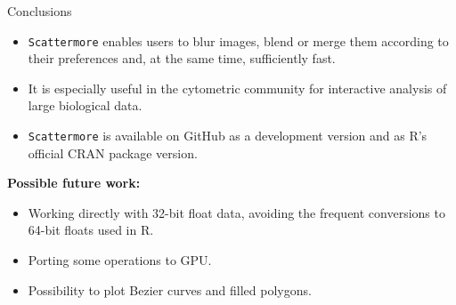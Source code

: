 \documentclass[portrait,a0paper,fontscale=0.25]{baposter}
\begin{document}
\begin{poster}
\begin{posterbox}[column=1, name=conclusion, below=main_result, bottomaligned=pipeline, headerColorOne=violet!50, boxColorOne=violet!20]{Conclusions}
\begin{itemize}
\item \texttt{Scattermore} enables users to blur images, blend or merge them according to their preferences and, at the same time, sufficiently fast.
\item It is especially useful in the cytometric community for interactive analysis of large biological data.
\item \texttt{Scattermore} is available on GitHub as a development version and as R's official CRAN package version.
\end{itemize}
\textbf{Possible future work:}
\begin{itemize}
\item Working directly with 32-bit float data, avoiding the frequent conversions to 64-bit floats used in R.
\item Porting some operations to GPU.
\item Possibility to plot Bezier curves and filled polygons.
\end{itemize}
\begin{center}
\end{center}
\end{posterbox}

\end{poster}
\end{document}
